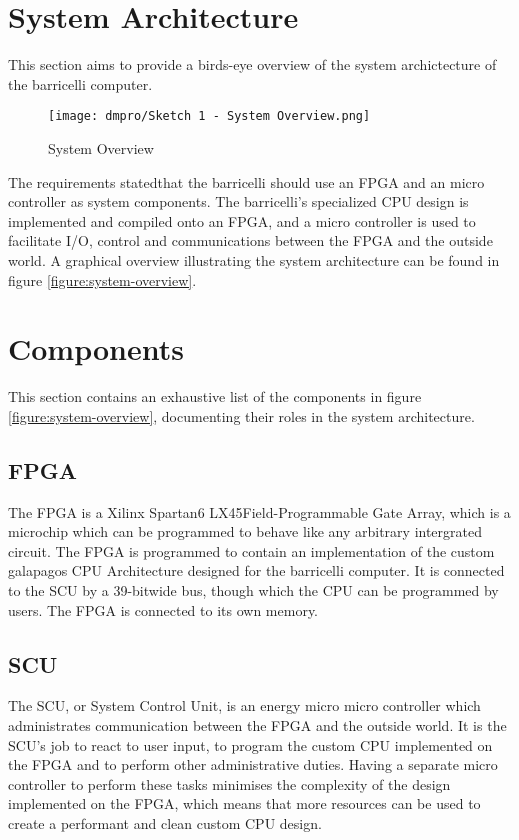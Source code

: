 \section{System Architecture}

This section aims to provide a birds-eye overview of the system archictecture of the \Gls{barricelli} computer.

\begin{figure}[H]
\texttt{[image: dmpro/Sketch 1 - System Overview.png]}
\caption{System Overview}
\label{figure:system-overview}
\end{figure}

The requirements stated\cn that the \Gls{barricelli} should use an FPGA and an micro controller as system components.
The \Gls{barricelli}'s specialized CPU design is implemented and compiled onto an FPGA, and a micro controller is used to facilitate I/O, control and communications between the FPGA and the outside world.
A graphical overview illustrating the system architecture can be found in figure \vref{figure:system-overview}.

\section{Components}

This section contains an exhaustive list of the components in figure \vref{figure:system-overview}, documenting their roles in the system architecture.

\subsection{FPGA}

The FPGA is a Xilinx Spartan6 LX45\cn Field-Programmable Gate Array, which is a microchip which can be programmed to behave like any arbitrary intergrated circuit.
The FPGA is programmed to contain an implementation of the custom \Gls{galapagos} CPU Architecture designed for the \Gls{barricelli} computer.
It is connected to the SCU by a 39-bit\cn wide bus, though which the CPU can be programmed by users.
The FPGA is connected to its own memory.

\subsection{SCU}

The SCU, or System Control Unit, is an energy micro micro controller  which administrates communication between the FPGA and the outside world.
It is the SCU's job to react to user input, to program the custom CPU implemented on the FPGA and to perform other administrative duties.
Having a separate micro controller to perform these tasks minimises the complexity of the design implemented on the FPGA, which means that more resources can be used to create a performant and clean custom CPU design.

